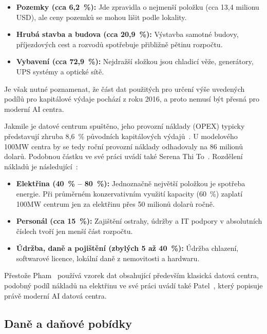 \begin{itemize}
    \item \textbf{Pozemky (cca 6,2~\%):} Jde zpravidla o nejmenší položku (cca 13,4 milionu USD), ale ceny pozemků se mohou lišit podle lokality.
    
    \item \textbf{Hrubá stavba a budova (cca 20,9~\%):} Výstavba samotné budovy, příjezdových cest a rozvodů spotřebuje přibližně pětinu rozpočtu.
    
    \item \textbf{Vybavení (cca 72,9~\%):} Nejdražší složkou jsou chladicí věže, generátory, UPS systémy a optické sítě.
\end{itemize}

Je však nutné poznamenat, že část dat použitých pro určení výše uvedených podílů pro kapitálové výdaje pochází z roku 2016, a proto nemusí být přesná pro moderní AI centra.

Jakmile je datové centrum spuštěno, jeho provozní náklady (OPEX) typicky představují zhruba 8,6~\% původních kapitálových výdajů~\cite[s.~9]{pham_data_2017}. U modelového 100MW centra by se tedy roční provozní náklady odhadovaly na 86 milionů dolarů. Podobnou částku ve své práci uvádí také Serena Thi To~\cite[s.~9]{to_albertas_2025}. Rozdělení nákladů je následující~\cite[s.~9]{pham_data_2017}:

\begin{itemize}
    \item \textbf{Elektřina (40~\% -- 80~\%):} Jednoznačně největší položkou je spotřeba energie. Při průměrném konzervativním využití kapacity (60~\%) zaplatí 100MW centrum jen za elektřinu přes 50 milionů dolarů ročně.

    \item \textbf{Personál (cca 15~\%):} Zajištění ostrahy, údržby a IT podpory v absolutních číslech tvoří jen menší část rozpočtu.
    
    \item \textbf{Údržba, daně a pojištění (zbylých 5 až 40~\%):} Údržba chlazení, softwarové licence, lokální daně z nemovitosti a hardwaru.
\end{itemize}

Přestože Pham~\cite{pham_data_2017} používá vzorek dat obsahující především klasická datová centra, podobný podíl nákladů na elektřinu ve své práci uvádí také Patel~\cite[s.~955]{pratikkumar_dilipkumar_patel_artificial_2025}, který popisuje právě moderní AI datová centra.

\subsection{Daně a daňové pobídky}
\label{subsec:daně}

